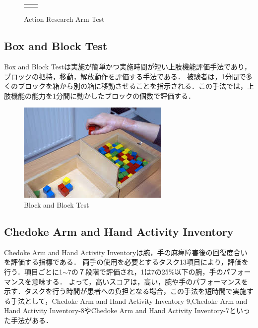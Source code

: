 \begin{figure}[H]
\begin{center}
\begin{tabular}{cc}
{} \\
\end{tabular}
\end{center}
   \caption{Action Research Arm Test}
\label{fig:ARAT}
\end{figure}


\subsection*{Box and Block Test}
Box and Block Test\cite{T.2005,Mathiowetz1985,Desrosiers1993,Lin2010}は実施が簡単かつ実施時間が短い上肢機能評価手法であり，ブロックの把持，移動，解放動作を評価する手法である．
被験者は，1分間で多くのブロックを箱から別の箱に移動させることを指示される．この手法では，上肢機能の能力を1分間に動かしたブロックの個数で評価する．
\begin{figure}[H]
  \centering
  \includegraphics[width=0.8\linewidth]{fig/ch1/babt}
  \caption{Block and Block Test}
  \label{fig:babt}
\end{figure}

\subsection*{Chedoke Arm and Hand Activity Inventory}
Chedoke Arm and Hand Activity Inventoryは腕，手の麻痺障害後の回復度合いを評価する指標である\cite{}．
両手の使用を必要とするタスク13項目により，評価を行う．項目ごとに1$\sim$7の７段階で評価され，1は7の25\%以下の腕，手のパフォーマンスを意味する．
よって，高いスコアは，高い，腕や手のパフォーマンスを示す．タスクを行う時間が患者への負担となる場合，この手法を短時間で実施する手法として，Chedoke Arm and Hand Activity Inventory-9,Chedoke Arm and Hand Activity Inventory-8やChedoke Arm and Hand Activity Inventory-7といった手法がある．

